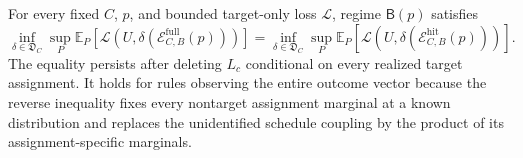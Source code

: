 For every fixed \(C\), \(p\), and bounded target-only loss \(\mathcal L\), regime \(\mathsf B(p)\) satisfies \[\inf_{\delta\in\mathfrak D_C}\sup_P\mathbb E_P[\mathcal L(U,\delta(\mathcal E_{C,B}^{\mathrm{full}}(p)))] = \inf_{\delta\in\mathfrak D_C}\sup_P\mathbb E_P[\mathcal L(U,\delta(\mathcal E_{C,B}^{\mathrm{hit}}(p)))].\] The equality persists after deleting \(L_c\) conditional on every realized target assignment. It holds for rules observing the entire outcome vector because the reverse inequality fixes every nontarget assignment marginal at a known distribution and replaces the unidentified schedule coupling by the product of its assignment-specific marginals.